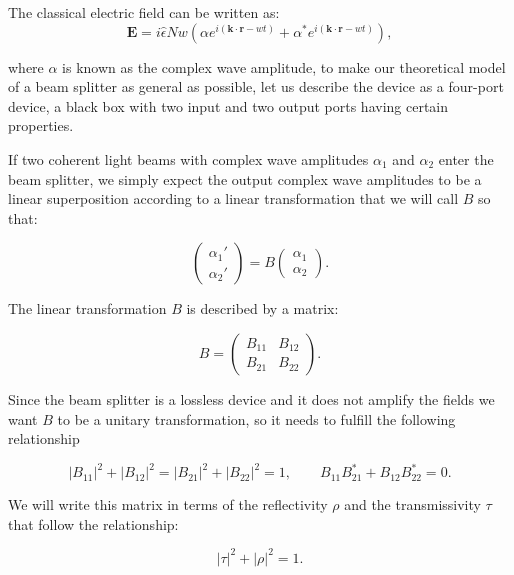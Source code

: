 \documentclass[12pt]{article}
\begin{document}
The classical electric field can be written as:
\begin{equation}
\mathbf{E}=i \hat{\epsilon}N w \left( \alpha e^{i (\mathbf{k \cdot r}-w t)}+\alpha^{*} e^{i (\mathbf{k \cdot r}-w t)} \right),
\end{equation}

where $\alpha$ is known as the complex wave amplitude, to make our theoretical model of a beam splitter as general as possible, let us describe the device as a four-port device, a black box with two input and two output ports having certain properties.

If two coherent light beams with complex wave amplitudes $\alpha_{1}$ and $\alpha_{2}$ enter the beam splitter, we simply expect the output complex wave amplitudes  to be a linear superposition  according to a linear transformation that we will call $B$ so that:

\begin{equation}
\begin{pmatrix} \alpha_{1}' \\ \alpha_{2}' \end{pmatrix}=B\begin{pmatrix} \alpha_{1} \\ \alpha_{2} \end{pmatrix}.
\end{equation}

The linear transformation $B$ is described by a matrix:

\begin{equation}
B=\begin{pmatrix} B_{11}& B_{12} \\B_{21} & B_{22} \end{pmatrix}.
\end{equation}

Since the beam splitter is a lossless device and it does not amplify the fields we want $B$ to be a unitary transformation, so it needs to fulfill the following relationship

\begin{equation}
|B_{11}|^{2}+|B_{12}|^{2}=|B_{21}|^{2}+|B_{22}|^{2}=1 ,\qquad B_{11} B_{21}^{*}+B_{12} B_{22}^{*}=0.
\end{equation}

We will write this matrix in terms of the reflectivity $\rho$ and the transmissivity $\tau$ that follow the relationship:

\begin{equation}
|\tau|^{2}+|\rho|^{2}=1.
\end{equation}
  
\end{document}
